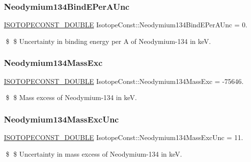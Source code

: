\subsubsection{\texorpdfstring{Neodymium134\+Bind\+E\+Per\+A\+Unc}{Neodymium134BindEPerAUnc}}
{\footnotesize\ttfamily \mbox{\hyperlink{group___isotope_const-_macros_ga8f45a7272ce02c0b4c65c44636ed719a}{I\+S\+O\+T\+O\+P\+E\+C\+O\+N\+S\+T\+\_\+\+D\+O\+U\+B\+LE}} Isotope\+Const\+::\+Neodymium134\+Bind\+E\+Per\+A\+Unc = 0.}

\$ \$ Uncertainty in binding energy per A of Neodymium-\/134 in keV. \mbox{\label{group___isotope_const-_neodymium-_nd134_ga82520eb89b954c305bd2f33d7301d45b}} 
\subsubsection{\texorpdfstring{Neodymium134\+Mass\+Exc}{Neodymium134MassExc}}
{\footnotesize\ttfamily \mbox{\hyperlink{group___isotope_const-_macros_ga8f45a7272ce02c0b4c65c44636ed719a}{I\+S\+O\+T\+O\+P\+E\+C\+O\+N\+S\+T\+\_\+\+D\+O\+U\+B\+LE}} Isotope\+Const\+::\+Neodymium134\+Mass\+Exc = -\/75646.}

\$ \$ Mass excess of Neodymium-\/134 in keV. \mbox{\label{group___isotope_const-_neodymium-_nd134_ga19f460e87d4b43a2238761df2bd114af}} 
\subsubsection{\texorpdfstring{Neodymium134\+Mass\+Exc\+Unc}{Neodymium134MassExcUnc}}
{\footnotesize\ttfamily \mbox{\hyperlink{group___isotope_const-_macros_ga8f45a7272ce02c0b4c65c44636ed719a}{I\+S\+O\+T\+O\+P\+E\+C\+O\+N\+S\+T\+\_\+\+D\+O\+U\+B\+LE}} Isotope\+Const\+::\+Neodymium134\+Mass\+Exc\+Unc = 11.}

\$ \$ Uncertainty in mass excess of Neodymium-\/134 in keV. \mbox{\label{group___isotope_const-_neodymium-_nd134_ga6a6f70886d5dc15bcb817665d78823e0}} 
